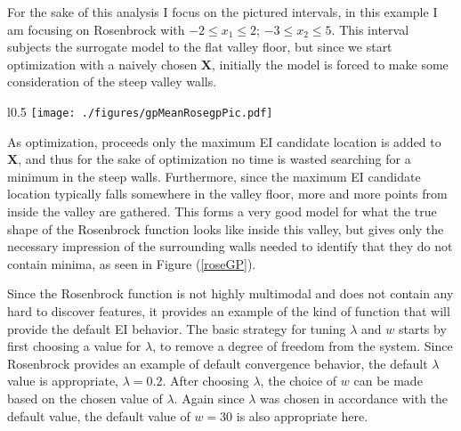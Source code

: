\documentclass[12pt]{article}
\begin{document}
	For the sake of this analysis I focus on the pictured intervals, in this example I am focusing on Rosenbrock with \mbox{$-2\le x_1\le2$}; \mbox{$-3\le x_2\le5$}.
	This interval subjects the surrogate model to the flat valley floor, but since we start optimization with a naively chosen $\bm{X}$,  initially the model is forced to make some consideration of the steep valley walls.
	
	\begin{wrapfigure}{l}{0.5\textwidth}
	\vspace{-1.1cm}
	\hspace{-1cm}
	\texttt{[image: ./figures/gpMeanRosegpPic.pdf]}
	\vspace{-2.5cm}
	\caption{The GP mean predictive surface of the Rosenbrock function after 70 iterations. }
	\label{roseGP}
	\end{wrapfigure}
	\noindent
	As optimization, proceeds only the maximum EI candidate location is added to $\bm{X}$, and thus for the sake of optimization no time is wasted searching for a minimum in the steep walls. %
	Furthermore, since the maximum EI candidate location typically falls somewhere in the valley floor, more and more points from inside the valley are gathered.
	This forms a very good model for what the true shape of the Rosenbrock function looks like inside this valley, but gives only the necessary impression of the surrounding walls needed to identify that they do not contain minima, as seen in Figure (\ref{roseGP}).
	
	
	Since the Rosenbrock function is not highly multimodal and does not contain any hard to discover features, it provides an example of the kind of function that will provide the default EI behavior.  
	The basic strategy for tuning $\lambda$ and $w$ starts by first choosing a value for $\lambda$, to remove a degree of freedom from the system. %
	Since Rosenbrock provides an example of default convergence behavior, the default $\lambda$ value is appropriate, $\lambda=0.2$.
	After choosing $\lambda$, the choice of $w$ can be made based on the chosen value of $\lambda$.
	Again since $\lambda$ was chosen in accordance with the default value, the default value of $w=30$ is also appropriate here.
\end{document}
